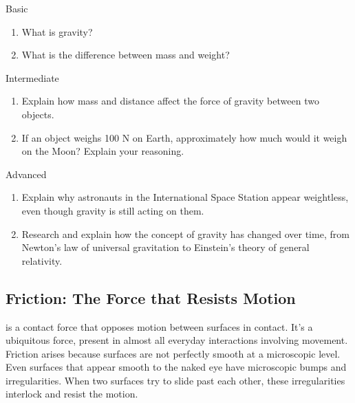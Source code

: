 \begin{tieredquestions}{Basic}
\begin{enumerate}
    \item What is gravity?
    \item What is the difference between mass and weight?
\end{enumerate}
\end{tieredquestions}

\begin{tieredquestions}{Intermediate}
\begin{enumerate}
    \item Explain how mass and distance affect the force of gravity between two objects.
    \item If an object weighs 100 N on Earth, approximately how much would it weigh on the Moon? Explain your reasoning.
\end{enumerate}
\end{tieredquestions}

\begin{tieredquestions}{Advanced}
\begin{enumerate}
    \item  Explain why astronauts in the International Space Station appear weightless, even though gravity is still acting on them.
    \item  Research and explain how the concept of gravity has changed over time, from Newton's law of universal gravitation to Einstein's theory of general relativity.
\end{enumerate}
\end{tieredquestions}


\subsection{Friction: The Force that Resists Motion}

\begin{marginnote}
\end{marginnote}
 is a contact force that opposes motion between surfaces in contact. It's a ubiquitous force, present in almost all everyday interactions involving movement.  Friction arises because surfaces are not perfectly smooth at a microscopic level.  Even surfaces that appear smooth to the naked eye have microscopic bumps and irregularities.  When two surfaces try to slide past each other, these irregularities interlock and resist the motion.

